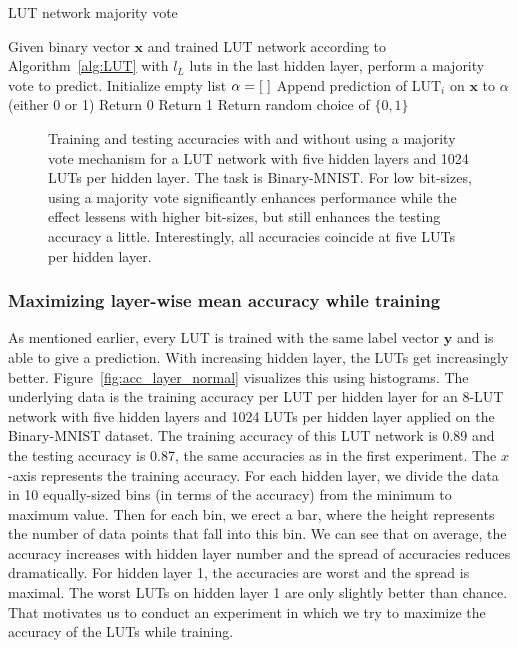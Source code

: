 \begin{algorithm}
  \caption{LUT network majority vote}
  \label{alg:majority_vote}
  \begin{algorithmic}
    \State Given binary vector $\bm{x}$ and trained LUT network according to Algorithm~\ref{alg:LUT} with $l_L$ luts in the last hidden layer, perform a majority vote to predict.
    \vspace{1em}
    \State Initialize empty list $\alpha = [\hspace{0.3em}]$
      \State Append prediction of LUT$_i$ on $\bm{x}$ to $\alpha$ (either 0 or 1)
    \EndFor
      \State Return 0
      \State Return 1
    \Else
      \State Return random choice of $\{0, 1\}$
    \EndIf
  \end{algorithmic}
\end{algorithm}
\FloatBarrier

\begin{figure}[!htb]
    \centering
    
    \caption{Training and testing accuracies with and without using a majority vote mechanism for a LUT network with five hidden layers and 1024 LUTs per hidden layer. The task is Binary-MNIST. For low bit-sizes, using a majority vote significantly enhances performance while the effect lessens with higher bit-sizes, but still enhances the testing accuracy a little. Interestingly, all accuracies coincide at five LUTs per hidden layer.}
\label{fig:majority_vote}
\end{figure}
\FloatBarrier

\subsubsection{Maximizing layer-wise mean accuracy while training} \label{sec:max_layer_acc}
As mentioned earlier, every LUT is trained with the same label vector $\bm{y}$ and is able to give a prediction. With increasing hidden layer, the LUTs get increasingly better. Figure~\ref{fig:acc_layer_normal} visualizes this using histograms. The underlying data is the training accuracy per LUT per hidden layer for an 8-LUT network with five hidden layers and 1024 LUTs per hidden layer applied on the Binary-MNIST dataset. The training accuracy of this LUT network is 0.89 and the testing accuracy is 0.87, the same accuracies as in the first experiment. The $x$-axis represents the training accuracy. For each hidden layer, we divide the data in 10 equally-sized bins (in terms of the accuracy) from the minimum to maximum value. Then for each bin, we erect a bar, where the height represents the number of data points that fall into this bin. We can see that on average, the accuracy increases with hidden layer number and the spread of accuracies reduces dramatically. For hidden layer 1, the accuracies are worst and the spread is maximal. The worst LUTs on hidden layer 1 are only slightly better than chance. That motivates us to conduct an experiment in which we try to maximize the accuracy of the LUTs while training.

